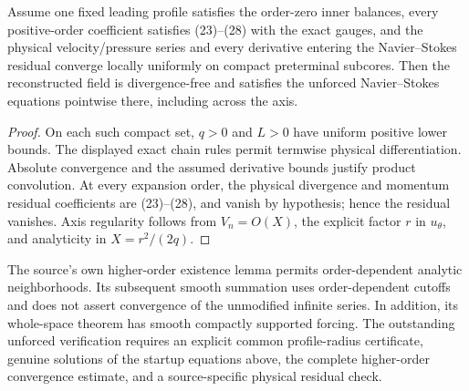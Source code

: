 \begin{lemma}
\label{lem:conditional-physical-residual}
Assume one fixed leading profile satisfies the order-zero inner
balances, every positive-order coefficient satisfies (23)--(28)
with the exact gauges, and the physical velocity/pressure series
and every derivative entering the Navier--Stokes residual converge
locally uniformly on compact preterminal subcores. Then the
reconstructed field is divergence-free and satisfies the unforced
Navier--Stokes equations pointwise there, including across the axis.
\end{lemma}
\begin{proof}
On each such compact set, $q>0$ and $L>0$ have uniform positive
lower bounds. The displayed exact chain rules permit termwise
physical differentiation. Absolute convergence and the assumed
derivative bounds justify product convolution. At every expansion
order, the physical divergence and momentum residual coefficients
are (23)--(28), and vanish by hypothesis; hence the residual
vanishes. Axis regularity follows from $V_n=O(X)$, the explicit
factor $r$ in $u_\theta$, and analyticity in $X=r^2/(2q)$.
\end{proof}

The source's own higher-order existence lemma permits
order-dependent analytic neighborhoods. Its subsequent smooth
summation uses order-dependent cutoffs and does not assert
convergence of the unmodified infinite series. In addition,
its whole-space theorem has smooth compactly supported forcing.
The outstanding unforced verification requires an explicit common
profile-radius certificate, genuine solutions of the startup
equations above, the complete higher-order convergence estimate,
and a source-specific physical residual check.
